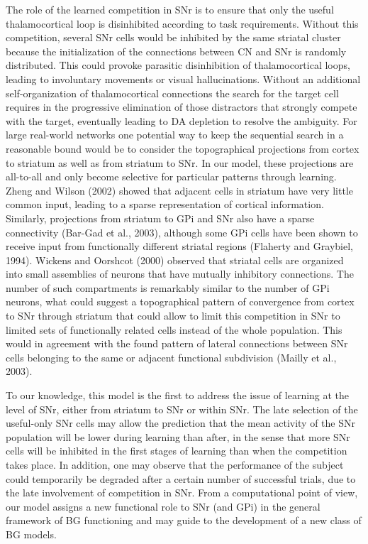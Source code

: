 \documentclass[
  11pt,
  a4paper,
]{scrbook}
\begin{document}
The role of the learned competition in SNr is to ensure that only the
useful thalamocortical loop is disinhibited according to task
requirements. Without this competition, several SNr cells would be
inhibited by the same striatal cluster because the initialization of the
connections between CN and SNr is randomly distributed. This could
provoke parasitic disinhibition of thalamocortical loops, leading to
involuntary movements or visual hallucinations. Without an additional
self-organization of thalamocortical connections the search for the
target cell requires in the progressive elimination of those distractors
that strongly compete with the target, eventually leading to DA
depletion to resolve the ambiguity. For large real-world networks one
potential way to keep the sequential search in a reasonable bound would
be to consider the topographical projections from cortex to striatum as
well as from striatum to SNr. In our model, these projections are
all-to-all and only become selective for particular patterns through
learning. Zheng and Wilson (2002) showed that adjacent cells in striatum
have very little common input, leading to a sparse representation of
cortical information. Similarly, projections from striatum to GPi and
SNr also have a sparse connectivity (Bar-Gad et al., 2003), although
some GPi cells have been shown to receive input from functionally
different striatal regions (Flaherty and Graybiel, 1994). Wickens and
Oorshcot (2000) observed that striatal cells are organized into small
assemblies of neurons that have mutually inhibitory connections. The
number of such compartments is remarkably similar to the number of GPi
neurons, what could suggest a topographical pattern of convergence from
cortex to SNr through striatum that could allow to limit this
competition in SNr to limited sets of functionally related cells instead
of the whole population. This would in agreement with the found pattern
of lateral connections between SNr cells belonging to the same or
adjacent functional subdivision (Mailly et al., 2003).

To our knowledge, this model is the first to address the issue of
learning at the level of SNr, either from striatum to SNr or within SNr.
The late selection of the useful-only SNr cells may allow the prediction
that the mean activity of the SNr population will be lower during
learning than after, in the sense that more SNr cells will be inhibited
in the first stages of learning than when the competition takes place.
In addition, one may observe that the performance of the subject could
temporarily be degraded after a certain number of successful trials, due
to the late involvement of competition in SNr. From a computational
point of view, our model assigns a new functional role to SNr (and GPi)
in the general framework of BG functioning and may guide to the
development of a new class of BG models.
\end{document}
